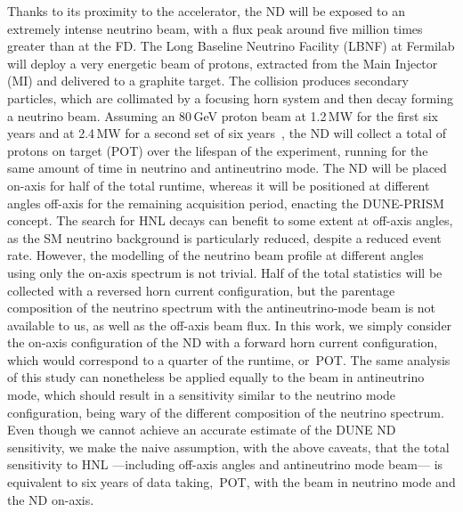 Thanks to its proximity to the accelerator, the ND will be exposed to an extremely intense neutrino beam, %
with a flux peak around five million times greater than at the FD.
The Long Baseline Neutrino Facility (LBNF) at Fermilab will deploy a very energetic beam of protons, %
extracted from the Main Injector (MI) and delivered to a graphite target.
The collision produces secondary particles, which are collimated by a focusing horn system and then decay forming a neutrino beam.
Assuming an 80\,GeV proton beam at 1.2\,MW for the first six years and at 2.4\,MW for a second set of six years~\cite{Abi:2018dnh}, 
the ND will collect a total of  protons on target (POT) over the lifespan of the experiment, %
running for the same amount of time in neutrino and antineutrino mode.
The ND will be placed on-axis for half of the total runtime, whereas it will be positioned %
at different angles off-axis for the remaining acquisition period, enacting the DUNE-PRISM concept.
The search for HNL decays can benefit to some extent at off-axis angles, %
as the SM neutrino background is particularly reduced, despite a reduced event rate.
However, the modelling of the neutrino beam profile at different angles using only the on-axis spectrum is not trivial.
Half of the total statistics will be collected with a reversed horn current configuration, %
but the parentage composition of the neutrino spectrum with the antineutrino-mode beam is not available to us, %
as well as the off-axis beam flux.
In this work, we simply consider the on-axis configuration of the ND with a forward horn current configuration, %
which would correspond to a quarter of the runtime, or \,POT.
The same analysis of this study can nonetheless be applied equally to the beam in antineutrino mode, %
which should result in a sensitivity similar to the neutrino mode configuration, %
being wary of the different composition of the neutrino spectrum.
Even though we cannot achieve an accurate estimate of the DUNE ND sensitivity, %
we make the naive assumption, with the above caveats, that the total sensitivity to HNL%
---including off-axis angles and antineutrino mode beam---%
is equivalent to six years of data taking, \ie {}\,POT, %
with the beam in neutrino mode and the ND on-axis.


